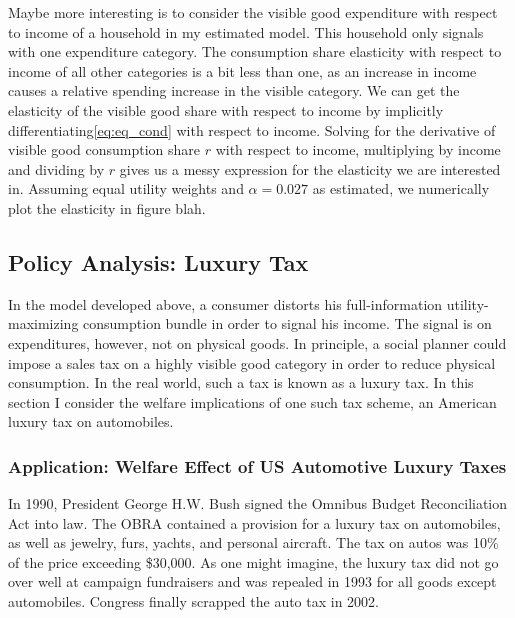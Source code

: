 \documentclass[12pt]{article}
\begin{document}
Maybe more interesting is to consider the visible good expenditure with respect to income of a household in my estimated model.  This household only signals with one expenditure category.  The consumption share elasticity with respect to income of all other categories is a bit less than one, as an increase in income causes a relative spending increase in the visible category.  We can get the elasticity of the visible good share with respect to income by implicitly differentiating\eqref{eq:eq_cond} with respect to income.  Solving for the derivative of visible good consumption share $r$ with respect to income, multiplying by income and dividing by $r$ gives us a messy expression for the elasticity we are interested in.  Assuming equal utility weights and $\alpha = 0.027$ as estimated, we numerically plot the elasticity in figure blah.


\subsection{Policy Analysis: Luxury Tax}

In the model developed above, a consumer distorts his full-information utility-maximizing consumption bundle in order to signal his income.  The signal is on expenditures, however, not on physical goods.  In principle, a social planner could impose a sales tax on a highly visible good category in order to reduce physical consumption.  In the real world, such a tax is known as a luxury tax.  In this section I consider the welfare implications of one such tax scheme, an American luxury tax on automobiles.

\subsubsection{Application: Welfare Effect of US Automotive Luxury Taxes}

In 1990, President George H.W. Bush signed the Omnibus Budget Reconciliation Act into law.\footnotemark{}  The OBRA contained a provision for a luxury tax on automobiles, as well as jewelry, furs, yachts, and personal aircraft.  The tax on autos was 10\% of the price exceeding \$30,000.  As one might imagine, the luxury tax did not go over well at campaign fundraisers and was repealed in 1993 for all goods except automobiles.\footnotemark{}  Congress finally scrapped the auto tax in 2002.
\end{document}
